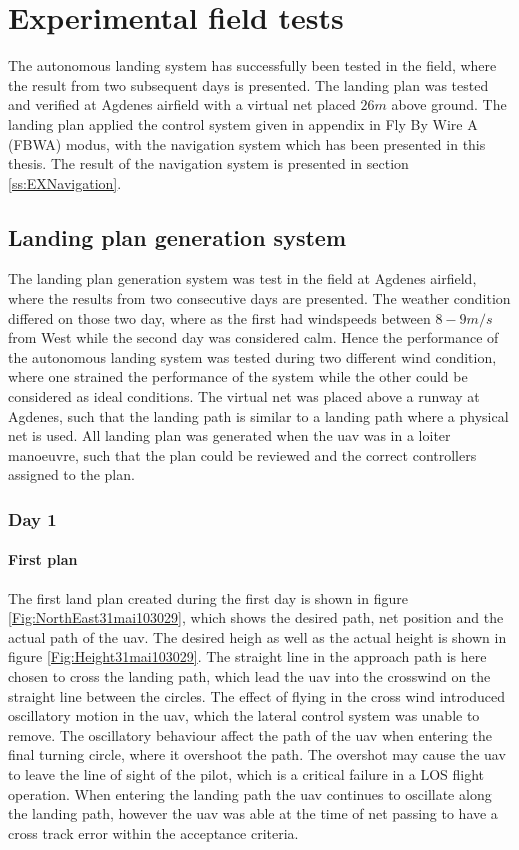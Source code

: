 \chapter{Experimental field tests}\label{Ch:ExperimentalTesting}
The autonomous landing system has successfully been tested in the field, where the result from two subsequent days is presented. The landing plan was tested and verified at Agdenes airfield with a virtual net placed $26 m$ above ground. The landing plan applied the control system given in appendix \citep{AP:ControlGuidanceSystem} in Fly By Wire A (FBWA) modus, with the navigation system which has been presented in this thesis. The result of the navigation system is presented in section \ref{ss:EXNavigation}.
\section{Landing plan generation system}
The landing plan generation system was test in the field at Agdenes airfield, where the results from two consecutive days are presented. The weather condition differed on those two day, where as the first had windspeeds between $8-9 m/s$ from West while the second day was considered calm. Hence the performance of the autonomous landing system was tested during two different wind condition, where one strained the performance of the system while the other could be considered as ideal conditions. The virtual net was placed above a runway at Agdenes, such that the landing path is similar to a landing path where a physical net is used. All landing plan was generated when the \gls{uav} was in a loiter manoeuvre, such that the plan could be reviewed and the correct controllers assigned to the plan.
\subsection{Day 1}
\subsubsection{First plan}\label{sss:Day1FirstPlan}
The first land plan created during the first day is shown in figure \ref{Fig:NorthEast31mai103029}, which shows the desired path, net position and the actual path of the \gls{uav}. The desired heigh as well as the actual height is shown in figure \ref{Fig:Height31mai103029}. The straight line in the approach path is here chosen to cross the landing path, which lead the \gls{uav} into the crosswind on the straight line between the circles. The effect of flying in the cross wind introduced oscillatory motion in the \gls{uav}, which the lateral control system was unable to remove. The oscillatory behaviour affect the path of the \gls{uav} when entering the final turning circle, where it overshoot the path. The overshot may cause the \gls{uav} to leave the line of sight of the pilot, which is a critical failure in a LOS flight operation. When entering the landing path the \gls{uav} continues to oscillate along the landing path, however the \gls{uav} was able at the time of net passing to have a cross track error within the acceptance criteria.


